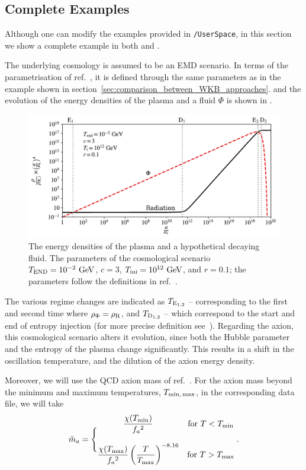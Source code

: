 \documentclass[11pt,a4paper]{article}
\begin{document}
\subsection{Complete Examples}\label{sec:complete_examples}
%
Although one can modify the examples provided in {\tt \mimes/UserSpace}, in this section we show a complete example in both \CPP and \PY. 
%

The underlying cosmology is assumed to be an EMD scenario. In terms of the parametrisation of ref.~\cite{Arias:2020qty}, it is defined through the same parameters as in the example shown in section~\ref{sec:comparison_between_WKB_approaches}.
%
and the evolution of the energy densities of the plasma and a fluid $\Phi$ is shown in .
%
\begin{figure}[t]
	\includegraphics[width=1\textwidth]{figs/energy_densities.pdf}
	\caption{The energy densities of the plasma and a hypothetical decaying fluid. The parameters of the cosmological scenario  $T_{\rm END}=10^{-2}~{\rm GeV}$, $c=3$, $T_{\rm ini}=10^{12}~{\rm GeV}$, and $r=0.1$; the parameters  follow the definitions in ref.~\cite{Arias:2020qty}. }
	\label{fig:energy_densities}
\end{figure}
%
The various regime changes are indicated as $T_{{\rm E}_{1,2}}$ -- corresponding to the first and second time where $\rho_{\Phi} = \rho_{\rm R}$,  and $T_{{\rm D}_{1,2}}$ -- which correspond to the start and end of entropy injection (for more precise definition see~\cite{Arias:2020qty}). Regarding the axion, this cosmological scenario alters it evolution, since both the Hubble parameter and the entropy of the plasma change significantly. This results in a shift in the oscillation temperature, and the dilution of the axion energy density.

Moreover, we will use the QCD axion mass of ref.~\cite{Borsanyi:2016ksw}. For the axion mass beyond the minimum and maximum temperatures, $T_{\rm min, \, max}$, in the corresponding data file, we will take
%
\begin{equation}
	\tilde m_{a}{} = \Bigg\{
	\begin{matrix}
		\dfrac{\chi(T_{\rm min})}{f_{a}{}^2} & \text{for } T<T_{\rm min} 
		\\ \\
		\dfrac{\chi(T_{\rm max})}{f_{a}{}^2}   \left( \dfrac{T}{T_{\rm max}} \right)^{-8.16} & \text{for } T>T_{\rm max} 
	\end{matrix} \;.
	\label{eq:axM-limits}
\end{equation}
\end{document}
